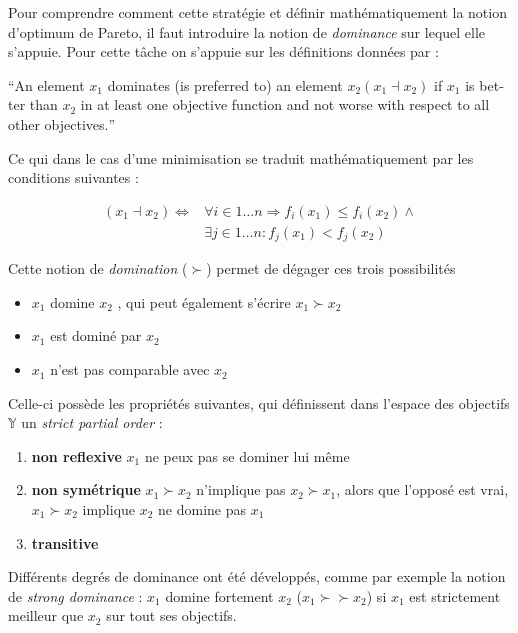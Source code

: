 Pour comprendre comment cette stratégie et définir mathématiquement la notion d'optimum de Pareto, il faut introduire la notion de \textit{dominance} sur lequel elle s'appuie. Pour cette tâche on s'appuie sur les définitions données par \textcite[65]{Weise2011} :

\foreignquote{english}{An element $x_1$ dominates (is preferred to) an element $x_2 (x_1 \dashv x_2)$ if $x_1$ is better than $x_2$ in at least one objective function and not worse with respect to all other objectives.}

Ce qui dans le cas d'une minimisation se traduit mathématiquement par les conditions suivantes :

\begin{align*}
	(x_1 \dashv x_2) \Leftrightarrow &\forall i \in 1 \dotsc n \Rightarrow  f_i (x_1) \leq f_i (x_2) \land \\
	&\exists j \in 1 \dotsc n : f_j (x_1) < f_j (x_2)
\end{align*}

Cette notion de \textit{domination} ($\succ$)  permet de dégager ces trois possibilités

\begin{itemize}
\item $x_1$ domine $x_2$ , qui peut également s'écrire $x_1 \succ x_2$
\item $x_1$ est dominé par $x_2$
\item $x_1$ n'est pas comparable avec $x_2$
\end{itemize}

Celle-ci possède les propriétés suivantes, qui définissent dans l'espace des objectifs $\mathbb{Y}$ un \textit{strict partial order} :

\begin{enumerate}
\item{\textbf{non reflexive}}  $x_1$ ne peux pas se dominer lui même
\item{\textbf{non symétrique}} $ x_1 \succ x_2$ n'implique pas $x_2 \succ x_1$, alors que l'opposé est vrai, $x_1 \succ x_2$ implique $x_2$ ne domine pas $x_1$
\item{\textbf{transitive} }
\end{enumerate}

Différents degrés de dominance ont été développés, comme par exemple la notion de \textit{strong dominance} : $x_1$ domine fortement $x_2$ ($x_1 \succ \succ x_2$) si $x_1$ est strictement meilleur que $x_2$ sur tout ses objectifs.

